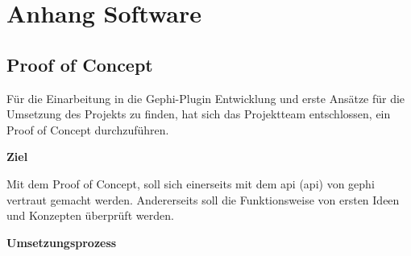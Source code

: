 \chapter{Anhang Software}

\section{Proof of Concept}
\label{poc}

Für die Einarbeitung in die Gephi-Plugin Entwicklung und erste Ansätze für die Umsetzung des Projekts zu finden, hat
sich das Projektteam entschlossen, ein Proof of Concept durchzuführen.

\textbf{Ziel}

Mit dem Proof of Concept, soll sich einerseits mit dem \acl{api} (\acs{api}) von \acs{gephi} vertraut gemacht werden.
Andererseits soll die Funktionsweise von ersten Ideen und Konzepten überprüft werden.

\textbf{Umsetzungsprozess}

